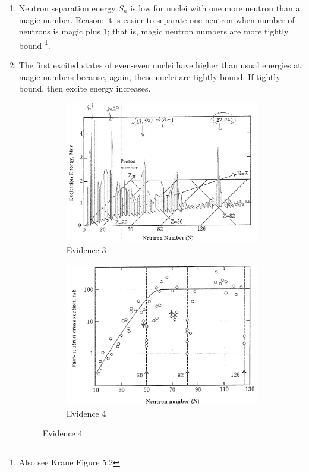 \documentclass{school-22.101-notes}
\begin{document}
\begin{enumerate}
\begin{enumerate}
\begin{figure}[ht]
\end{figure}
\item Neutron separation energy $S_n$ is low for nuclei with one more neutron than a magic number. Reason: it is easier to separate one neutron when number of neutrons is magic plus 1; that is, magic neutron numbers are more tightly bound \footnote{Also see Krane Figure 5.2}. 
\item The first excited states of even-even nuclei have higher than usual energies at magic numbers because, again, these nuclei are tightly bound. If tightly bound, then excite energy increases. 
\begin{figure}[ht]
  \centering
  \begin{subfigure}[b]{0.45\textwidth}
    \centering
    \includegraphics[width=\textwidth]{images/shell/shell-evidence-3.png}
    \caption{Evidence 3}
    \label{fig:111}
  \end{subfigure}
  \begin{subfigure}[b]{0.45\textwidth}
    \centering
    \includegraphics[width=\textwidth]{images/shell/shell-evidence-4.png}
    \caption{Evidence 4}
    \label{fig:111}
  \end{subfigure}
\end{figure}


\end{enumerate}
\end{enumerate}
\end{document}

